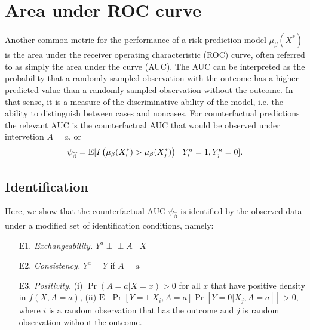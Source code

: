 \section{Area under ROC curve}\label{sec:auc}
Another common metric for the performance of a risk prediction model $\mu_\beta(X^*)$ is the area under the receiver operating characteristic (ROC) curve, often referred to as simply the area under the curve (AUC). The AUC can be interpreted as the probability that a randomly sampled observation with the outcome has a higher predicted value than a randomly sampled observation without the outcome. In that sense, it is a measure of the discriminative ability of the model, i.e. the ability to distinguish between cases and noncases. For counterfactual predictions the relevant AUC is the counterfactual AUC that would be observed under intervetion $A=a$, or
\begin{equation}\label{eqn:auc_estimand}
    \psi_{\widehat{\beta}} = \operatorname{E}[I\left(\mu_\beta(X^*_i) > \mu_\beta(X^*_j)\right) \mid Y_i^a = 1, Y_j^a = 0].
\end{equation}

\subsection{Identification}
Here, we show that the counterfactual AUC $\psi_{\widehat{\beta}}$ is identified by the observed data under a modified set of identification conditions, namely:
\begin{enumerate}
    \item[E1.] \textit{Exchangeability.} $Y^a \perp\!\!\!\perp A \mid X$ 
    \item[E2.] \textit{Consistency.} $Y^a = Y$ if $A = a$
    \item[E3.] \textit{Positivity.} (i) $\Pr(A = a | X = x) > 0$ for all $x$ that have positive density in $f(X, A = a)$, (ii) $\mathrm{E}\left[\Pr[Y = 1 | X_i, A = a]\Pr[Y = 0 | X_j, A = a]\right] > 0 $, where $i$ is a random observation that has the outcome and $j$ is random observation without the outcome.
\end{enumerate}


